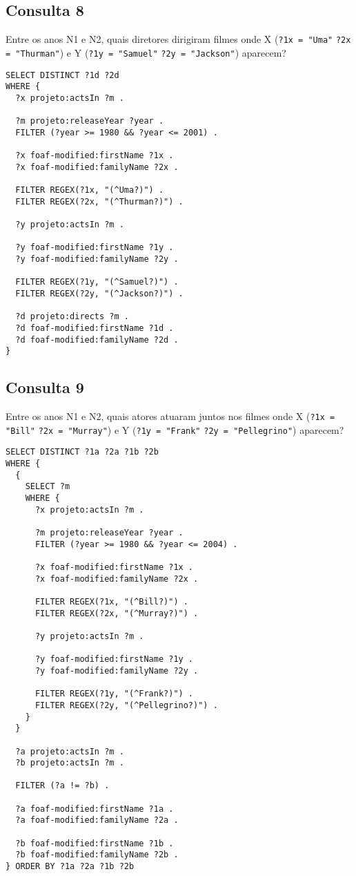 \documentclass{article}
\newcommand{\code}[1]{\lstinline[mathescape=true]{#1}}
\begin{document}
\subsection{Consulta 8}
Entre os anos N1 e N2, quais diretores dirigiram filmes onde X (\code{?1x = "Uma"} \code{?2x = "Thurman"}) e Y (\code{?1y = "Samuel"} \code{?2y = "Jackson"}) aparecem?

\begin{lstlisting}[basicstyle=\ttfamily,frame=single]
SELECT DISTINCT ?1d ?2d
WHERE {
  ?x projeto:actsIn ?m .
  
  ?m projeto:releaseYear ?year .
  FILTER (?year >= 1980 && ?year <= 2001) .

  ?x foaf-modified:firstName ?1x .
  ?x foaf-modified:familyName ?2x .

  FILTER REGEX(?1x, "(^Uma?)") .
  FILTER REGEX(?2x, "(^Thurman?)") .

  ?y projeto:actsIn ?m .

  ?y foaf-modified:firstName ?1y .
  ?y foaf-modified:familyName ?2y .

  FILTER REGEX(?1y, "(^Samuel?)") .
  FILTER REGEX(?2y, "(^Jackson?)") .

  ?d projeto:directs ?m .
  ?d foaf-modified:firstName ?1d .
  ?d foaf-modified:familyName ?2d .
}
\end{lstlisting}
\subsection{Consulta 9}
Entre os anos N1 e N2, quais atores atuaram juntos nos filmes onde X (\code{?1x = "Bill"} \code{?2x = "Murray"}) e Y (\code{?1y = "Frank"} \code{?2y = "Pellegrino"}) aparecem?

\begin{lstlisting}[basicstyle=\ttfamily,frame=single]
SELECT DISTINCT ?1a ?2a ?1b ?2b
WHERE {
  {
    SELECT ?m
    WHERE {
      ?x projeto:actsIn ?m .
      
      ?m projeto:releaseYear ?year .
      FILTER (?year >= 1980 && ?year <= 2004) .

      ?x foaf-modified:firstName ?1x .
      ?x foaf-modified:familyName ?2x .

      FILTER REGEX(?1x, "(^Bill?)") .
      FILTER REGEX(?2x, "(^Murray?)") .

      ?y projeto:actsIn ?m .

      ?y foaf-modified:firstName ?1y .
      ?y foaf-modified:familyName ?2y .

      FILTER REGEX(?1y, "(^Frank?)") .
      FILTER REGEX(?2y, "(^Pellegrino?)") .
    }
  }

  ?a projeto:actsIn ?m .
  ?b projeto:actsIn ?m .

  FILTER (?a != ?b) .

  ?a foaf-modified:firstName ?1a .
  ?a foaf-modified:familyName ?2a . 

  ?b foaf-modified:firstName ?1b .
  ?b foaf-modified:familyName ?2b .
} ORDER BY ?1a ?2a ?1b ?2b
\end{lstlisting}
\end{document}
